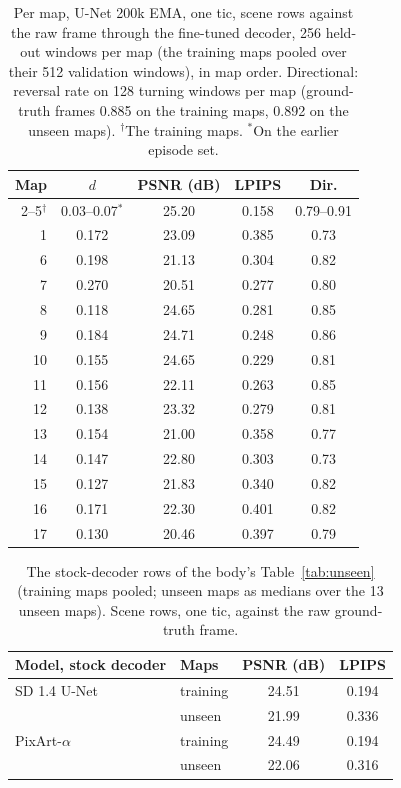 \begin{table}[ht]
\centering\scriptsize\setlength{\tabcolsep}{2.5pt}
\caption{Per map, U-Net 200k EMA, one tic, scene rows against the raw frame through the fine-tuned decoder, 256 held-out windows per map (the training maps pooled over their 512 validation windows), in map order. Directional: reversal rate on 128 turning windows per map (ground-truth frames 0.885 on the training maps, 0.892 on the unseen maps). $^\dagger$The training maps. $^\ast$On the earlier episode set.}
\label{tab:perarena}
\begin{tabular}{rcccc}
\toprule
Map & $d$ & PSNR (dB) & LPIPS & Dir. \\
\midrule
2--5$^\dagger$ & 0.03--0.07$^\ast$ & 25.20 & 0.158 & 0.79--0.91 \\
\midrule
1 & 0.172 & 23.09 & 0.385 & 0.73 \\
6 & 0.198 & 21.13 & 0.304 & 0.82 \\
7 & 0.270 & 20.51 & 0.277 & 0.80 \\
8 & 0.118 & 24.65 & 0.281 & 0.85 \\
9 & 0.184 & 24.71 & 0.248 & 0.86 \\
10 & 0.155 & 24.65 & 0.229 & 0.81 \\
11 & 0.156 & 22.11 & 0.263 & 0.85 \\
12 & 0.138 & 23.32 & 0.279 & 0.81 \\
13 & 0.154 & 21.00 & 0.358 & 0.77 \\
14 & 0.147 & 22.80 & 0.303 & 0.73 \\
15 & 0.127 & 21.83 & 0.340 & 0.82 \\
16 & 0.171 & 22.30 & 0.401 & 0.82 \\
17 & 0.130 & 20.46 & 0.397 & 0.79 \\
\bottomrule
\end{tabular}
\end{table}

\begin{table}[ht]
\centering\footnotesize\setlength{\tabcolsep}{3.2pt}
\caption{The stock-decoder rows of the body's Table~\ref{tab:unseen} (training maps pooled; unseen maps as medians over the 13 unseen maps). Scene rows, one tic, against the raw ground-truth frame.}
\label{tab:stockrows}
\begin{tabular}{llcc}
\toprule
Model, stock decoder & Maps & PSNR (dB) & LPIPS \\
\midrule
SD 1.4 U-Net & training & 24.51 & 0.194 \\
 & unseen & 21.99 & 0.336 \\
PixArt-$\alpha$ & training & 24.49 & 0.194 \\
 & unseen & 22.06 & 0.316 \\
\bottomrule
\end{tabular}
\end{table}


